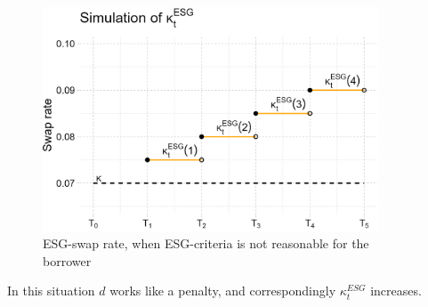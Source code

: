 \begin{figure}[htp]
    \centering
    \includegraphics[width= 10cm]{figures/ESG/kappa_t_ESG_3.png}
    \caption{ESG-swap rate, when ESG-criteria is not reasonable for the borrower}
    \label{fig: ESG_swap_3}
\end{figure}

In this situation $d$ works like a penalty, and correspondingly $\kappa_{t}^{ESG}$ increases. 











